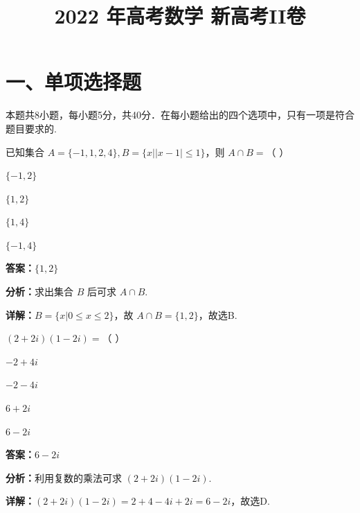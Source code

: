 ﻿\title{2022 年高考数学 新高考II卷}
\date{}
\maketitle

\section*{一、单项选择题}
本题共8小题，每小题5分，共40分．在每小题给出的四个选项中，只有一项是符合题目要求的.

\begin{question}[points=5]
已知集合 $A=\{-1,1,2,4\}, B=\{x||x-1|\leq 1\}$，则 $A\cap B=$（ ）
\begin{choices}
  \item $\{-1,2\}$
  \item $\{1,2\}$
  \item $\{1,4\}$
  \item $\{-1,4\}$
\end{choices}
\begin{solution}
\textbf{答案：}$\{1,2\}$

\textbf{分析：}求出集合 $B$ 后可求 $A\cap B$.

\textbf{详解：}$B=\{x|0\leq x\leq 2\}$，故 $A\cap B=\{1,2\}$，故选B.
\end{solution}
\end{question}

\begin{question}[points=5]
$(2+2i)(1-2i)=$（ ）
\begin{choices}
  \item $-2+4i$
  \item $-2-4i$
  \item $6+2i$
  \item $6-2i$
\end{choices}
\begin{solution}
\textbf{答案：}$6-2i$

\textbf{分析：}利用复数的乘法可求 $(2+2i)(1-2i)$.

\textbf{详解：}$(2+2i)(1-2i)=2+4-4i+2i=6-2i$，故选D.
\end{solution}
\end{question}

